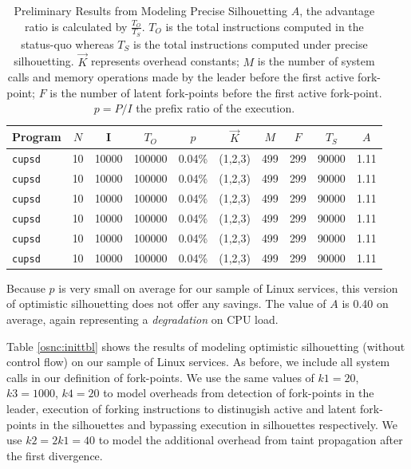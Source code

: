 \begin{table}[h]
  \caption{\hspace{0.2in}Preliminary Results from Modeling Precise Silhouetting \newline \newline 
  $A$, the advantage ratio is calculated by $\frac{T_O}{T_S}$.
  $T_O$ is the total instructions computed in the status-quo whereas $T_S$ is the total instructions computed under
  precise silhouetting. $\vec K$ represents overhead constants; $M$ is the number
  of system calls and memory operations made by the leader before the first active fork-point; $F$
  is the number of latent fork-points before the first active fork-point. $p = P/I$
  the prefix ratio of the execution. }
\label{ps:inittbl}
\begin{center}
\begin{tabular}{|l||c|c||c||c|c|c|c||c||c|}\hline
  Program & $N$ & I & $T_O$ & $p$ & $\vec K$ & $M$ & $F$ & $T_S$ & $A$ \\\hline
  \texttt{cupsd} & 10 & 10000 & 100000 & 0.04\% & (1,2,3) & 499 & 299 & 90000 & 1.11  \\\hline
  \texttt{cupsd} & 10 & 10000 & 100000 & 0.04\% & (1,2,3) & 499 & 299 & 90000 & 1.11  \\\hline
  \texttt{cupsd} & 10 & 10000 & 100000 & 0.04\% & (1,2,3) & 499 & 299 & 90000 & 1.11  \\\hline
  \texttt{cupsd} & 10 & 10000 & 100000 & 0.04\% & (1,2,3) & 499 & 299 & 90000 & 1.11  \\\hline
  \texttt{cupsd} & 10 & 10000 & 100000 & 0.04\% & (1,2,3) & 499 & 299 & 90000 & 1.11  \\\hline

  \texttt{cupsd} & 10 & 10000 & 100000 & 0.04\% & (1,2,3) & 499 & 299 & 90000 & 1.11  \\\hline
\end{tabular}
\end{center}
\end{table}

Because $p$ is very small on average for our sample of Linux services, 
this version of optimistic silhouetting does not offer any savings.
The value of $A$ is 0.40
on average, again representing a {\em degradation}
on CPU load.
 
 \newline
Table \ref{osnc:inittbl} shows the results of modeling 
optimistic silhouetting (without control flow) on our sample of Linux services.
As before, we include all system calls in our definition
of fork-points.
We use the same values of $k1 = 20$, $k3 = 1000$, $k4 = 20$
to model overheads from detection of fork-points in the leader,
execution of forking instructions to distinugish
active and latent fork-points in the silhouettes and
bypassing execution in silhouettes respectively.
We use $k2 = 2k1 = 40$ to model the additional
overhead from taint propagation after the first
divergence.

